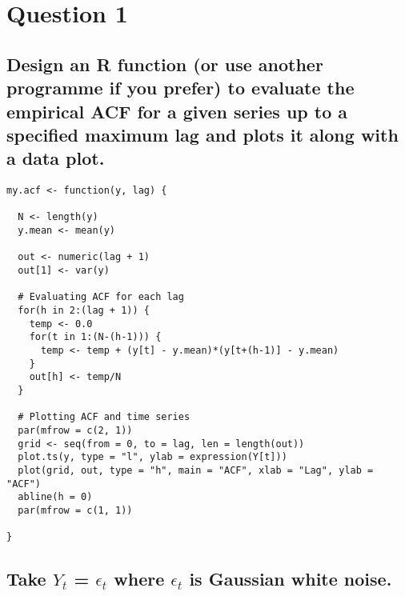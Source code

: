 \documentclass[10pt,a4paper]{article}
\begin{document}
\section{Question 1}
\subsection{Design an R function (or use another programme if you prefer) to evaluate the
empirical ACF for a given series up to a specified maximum lag and plots it along
with a data plot.}


\begin{lstlisting}
my.acf <- function(y, lag) {
  
  N <- length(y)
  y.mean <- mean(y)
  
  out <- numeric(lag + 1)
  out[1] <- var(y)
  
  # Evaluating ACF for each lag
  for(h in 2:(lag + 1)) {
    temp <- 0.0
    for(t in 1:(N-(h-1))) {
      temp <- temp + (y[t] - y.mean)*(y[t+(h-1)] - y.mean)
    }
    out[h] <- temp/N
  }
  
  # Plotting ACF and time series
  par(mfrow = c(2, 1))
  grid <- seq(from = 0, to = lag, len = length(out))
  plot.ts(y, type = "l", ylab = expression(Y[t]))
  plot(grid, out, type = "h", main = "ACF", xlab = "Lag", ylab = "ACF")
  abline(h = 0)
  par(mfrow = c(1, 1))
  
}
\end{lstlisting}


\subsection{Take $Y_t$ = $\epsilon_t$ where $\epsilon_t$
is Gaussian white noise.}
\end{document}

